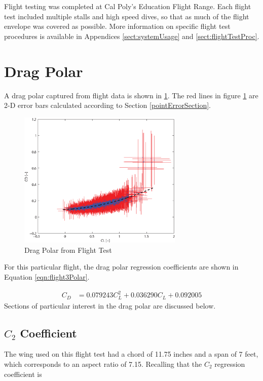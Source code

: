 Flight testing was completed at Cal Poly's Education Flight Range. Each flight test included multiple stalls and high speed dives, so that as much of the flight envelope was covered as possible. More information on specific flight test procedures is available in Appendices \ref{sect:systemUsage} and \ref{sect:flightTestProc}.

\section{Drag Polar}
A drag polar captured from flight data is shown in \ref{fig:flight3PolarErrorBars}. The red lines in figure \ref{fig:flight3PolarErrorBars} are 2-D error bars calculated according to Section \ref{pointErrorSection}.

\begin{figure}[H]
  \centering
    \includegraphics[width=0.7\textwidth]{figures/flight3PolarErrorBars.eps}  \caption{Drag Polar from Flight Test} \label{fig:flight3PolarErrorBars}
\end{figure}
 For this particular flight, the drag polar regression coefficients are shown in Equation \ref{eqn:flight3Polar}.

\begin{align}
\label{eqn:flight3Polar}
C_D &= 0.079243C_L^2 + 0.036290C_L + 0.092005
\end{align}
Sections of particular interest in the drag polar are discussed below.

\subsection{$C_2$ Coefficient}
The wing used on this flight test had a chord of 11.75 inches and a span of 7 feet, which corresponds to an aspect ratio of 7.15. Recalling that the $C_2$ regression coefficient is

